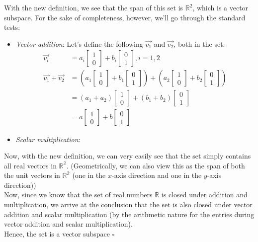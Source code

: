 \begin{enumerate}
{	With the new definition, we see that the span of this set is $\mathbb{R}^2$, which is a vector subspace. For the sake of completeness, however, we'll go through the standard tests:
	\begin{itemize}
		\item \textit{Vector addition}: Let's define the following $\vec{v_1}$ and $\vec{v_2}$, both in the set.
		\begin{align*}
			\vec{v_i} &= a_i\begin{bmatrix}1\\0\end{bmatrix} + b_i\begin{bmatrix}0\\1\end{bmatrix}, i=1, 2\\
			\vec{v_1} + \vec{v_2} &= \left(a_1\begin{bmatrix}1\\0\end{bmatrix} + b_1\begin{bmatrix}0\\1\end{bmatrix}\right) + \left(a_2\begin{bmatrix}1\\0\end{bmatrix} + b_2\begin{bmatrix}0\\1\end{bmatrix}\right)\\
				&= \left(a_1 + a_2\right)\begin{bmatrix}1\\0\end{bmatrix} + \left(b_1 + b_2\right)\begin{bmatrix}0\\1\end{bmatrix}\\
				&= a\begin{bmatrix}1\\0\end{bmatrix} + b\begin{bmatrix}0\\1\end{bmatrix}
		\end{align*}
		\item \textit{Scalar multiplication}:
	\end{itemize}

	Now, with the new definition, we can very easily see that the set simply contains all real vectors in $\mathbb{R^2}$. (Geometrically, we can also view this as the span of both the unit vectors in $\mathbb{R^2}$ (one in the $x$-axis direction and one in the $y$-axis direction)) \\
	Now, since we know that the set of real numbers $\mathbb{R}$ is closed under addition and multiplication, we arrive at the conclusion that the set is also closed under vector addition and scalar multiplication (by the arithmetic nature for the entries during vector addition and scalar multiplication). \\ Hence, the set is a vector subspace $\square$
}


\end{enumerate}
